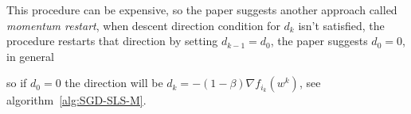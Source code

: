 This procedure can be expensive, so the paper suggests another approach called \emph{momentum restart}, when descent direction condition for $d_k$ isn't satisfied, the procedure restarts that direction by setting $d_{k-1}=d_0$, the paper suggests $d_0=0$, in general
\begin{center}
\end{center}
so if $d_0=0$ the direction will be $d_k=-(1-\beta)\nabla f_{i_k}(w^k)$, see algorithm~\vref{alg:SGD-SLS-M}.
